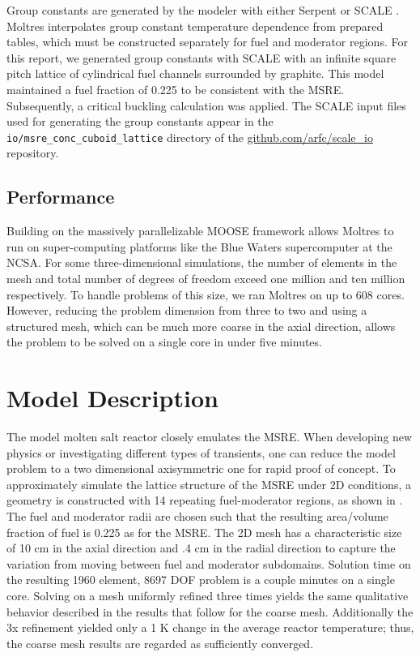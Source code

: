 \documentclass{article}
\let\Oldsection\section
\renewcommand{\section}{\FloatBarrier\Oldsection}
\let\Oldsubsection\subsection
\renewcommand{\subsection}{\FloatBarrier\Oldsubsection}
\newcommand{\code}[1]{\texttt{#1}}
\begin{document}
Group constants are generated by the modeler with either Serpent
\cite{leppanen_serpent_2015} or SCALE \cite{dehart_reactor_2011}. Moltres
interpolates group constant temperature dependence from prepared tables, which must be
constructed separately for fuel and moderator regions. For this report,
we generated group constants with SCALE with
an infinite square pitch lattice of cylindrical fuel channels surrounded by
graphite. This model maintained a fuel fraction of 0.225 to be consistent with the
\gls{MSRE}. Subsequently, a critical buckling calculation was applied. The SCALE
input files used for generating the group constants appear in the
\code{io/msre\_conc\_cuboid\_lattice} directory of the
\url{github.com/arfc/scale_io} repository.

\subsection{Performance}

Building on the massively parallelizable \gls{MOOSE} framework allows Moltres
to run on super-computing platforms like the Blue Waters supercomputer at the
\gls{NCSA}. For some
three-dimensional simulations, the number of
elements in the mesh and total number of degrees of freedom exceed one million
and ten million respectively. To handle problems of this size, we ran Moltres
on up to 608 cores. However, reducing the problem dimension from three to
two and using a structured mesh, which can be much more coarse in the axial
direction, allows the problem to be solved on a single core in under
five minutes.

\section{Model Description}

The model molten salt reactor closely emulates the \gls{MSRE}. When developing new physics or investigating
different types of transients, one can reduce the model problem to a two
dimensional axisymmetric one for rapid proof of concept. To approximately simulate the lattice
structure of the \gls{MSRE} under 2D conditions, a geometry is constructed with 14 repeating
fuel-moderator regions, as shown in . The fuel and moderator
radii are chosen such that the resulting area/volume fraction of fuel is 0.225 as
for the \gls{MSRE}. The 2D mesh has a characteristic size of 10 cm in the axial
direction and .4 cm in the radial direction to capture the variation from moving
between fuel and moderator subdomains. Solution time on the resulting 1960
element, 8697 DOF problem is a couple minutes on a single core. Solving on a
mesh uniformly refined three times yields the same qualitative behavior
described in the results that follow for the coarse mesh. Additionally the 3x
refinement yielded only a 1 K change in the average reactor temperature; thus,
the coarse mesh results are regarded as sufficiently converged.
\end{document}
